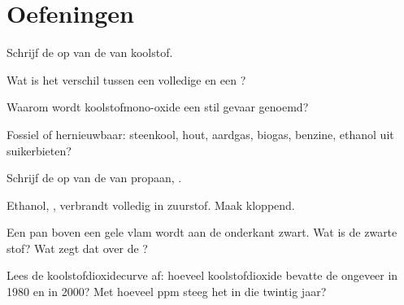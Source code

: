 \section{Oefeningen}

\begin{exercise}[$\star$]\label{exo:g8:combustion-and-fuels:1}
Schrijf de  op van de 
van koolstof.
\end{exercise}

\begin{exercise}[$\star$]\label{exo:g8:combustion-and-fuels:2}
Wat is het verschil tussen een volledige en een ?
\end{exercise}

\begin{exercise}[$\star$]\label{exo:g8:combustion-and-fuels:3}
Waarom wordt koolstofmono-oxide een stil gevaar genoemd?
\end{exercise}

\begin{exercise}[$\star$]\label{exo:g8:combustion-and-fuels:4}
Fossiel of hernieuwbaar: steenkool, hout, aardgas, biogas, benzine,
ethanol uit suikerbieten?
\end{exercise}

\begin{exercise}[$\star\star$]\label{exo:g8:combustion-and-fuels:5}
Schrijf de  op van de 
van propaan, .
\end{exercise}

\begin{exercise}[$\star\star$]\label{exo:g8:combustion-and-fuels:6}
Ethanol, , verbrandt volledig in zuurstof. Maak
 kloppend. %
\end{exercise}

\begin{exercise}[$\star\star$]\label{exo:g8:combustion-and-fuels:7}
Een pan boven een gele vlam wordt aan de onderkant zwart. Wat is de
zwarte stof? Wat zegt dat over de ?
\end{exercise}

\begin{exercise}[$\star\star$]\label{exo:g8:combustion-and-fuels:8}
Lees de koolstofdioxidecurve af: hoeveel koolstofdioxide bevatte de 
ongeveer in 1980 en in 2000? Met hoeveel ppm steeg het in die twintig
jaar?
\end{exercise}

